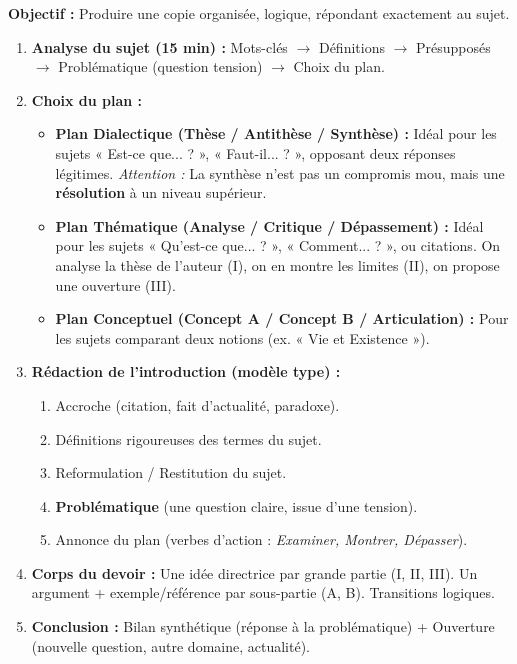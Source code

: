 \documentclass[11pt]{article}
\begin{document}
\begin{methode}
\textbf{Objectif :} Produire une copie organisée, logique, répondant exactement au sujet.
\begin{enumerate}
    \item \textbf{Analyse du sujet (15 min) :} Mots-clés $\to$ Définitions $\to$ Présupposés $\to$ Problématique (question tension) $\to$ Choix du plan.
    \item \textbf{Choix du plan :}
    \begin{itemize}
        \item \textbf{Plan Dialectique (Thèse / Antithèse / Synthèse) :} Idéal pour les sujets « Est-ce que... ? », « Faut-il... ? », opposant deux réponses légitimes. \textit{Attention :} La synthèse n'est pas un compromis mou, mais une \textbf{résolution} à un niveau supérieur.
        \item \textbf{Plan Thématique (Analyse / Critique / Dépassement) :} Idéal pour les sujets « Qu'est-ce que... ? », « Comment... ? », ou citations. On analyse la thèse de l'auteur (I), on en montre les limites (II), on propose une ouverture (III).
        \item \textbf{Plan Conceptuel (Concept A / Concept B / Articulation) :} Pour les sujets comparant deux notions (ex. « Vie et Existence »).
    \end{itemize}
    \item \textbf{Rédaction de l'introduction (modèle type) :}
    \begin{enumerate}
        \item Accroche (citation, fait d'actualité, paradoxe).
        \item Définitions rigoureuses des termes du sujet.
        \item Reformulation / Restitution du sujet.
        \item \textbf{Problématique} (une question claire, issue d'une tension).
        \item Annonce du plan (verbes d'action : \emph{Examiner, Montrer, Dépasser}).
    \end{enumerate}
    \item \textbf{Corps du devoir :} Une idée directrice par grande partie (I, II, III). Un argument + exemple/référence par sous-partie (A, B). Transitions logiques.
    \item \textbf{Conclusion :} Bilan synthétique (réponse à la problématique) + Ouverture (nouvelle question, autre domaine, actualité).
\end{enumerate}
\end{methode}
\end{document}
